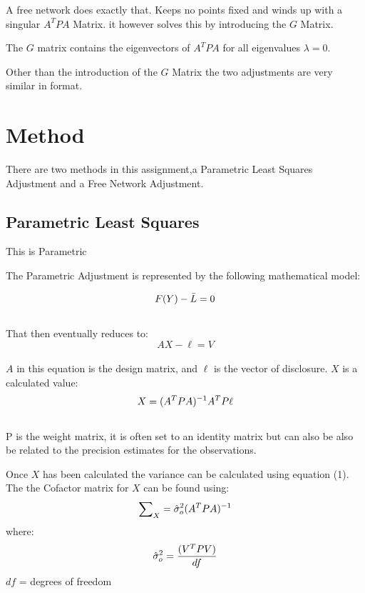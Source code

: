 \documentclass[11pt,a4paper]{article}
\begin{document}
	A free network does exactly that. Keeps no points fixed and winds up with a singular $A^TPA$ Matrix. it however solves this by introducing the $G$ Matrix.
	
	The $G$ matrix contains the eigenvectors of $A^TPA$ for all eigenvalues $\lambda = 0$.
	
	Other than the introduction of the $G$ Matrix the two adjustments are very similar in format.

	
	\section{Method}
	
	There are two methods in this assignment,a Parametric Least Squares Adjustment and a Free Network Adjustment.
	
		\subsection{Parametric Least Squares}
		This is Parametric
		
		The Parametric Adjustment is represented by the following mathematical model:
		
		\begin{equation}
		\notag
		F(Y) - \bar{L} = 0
		\end{equation}
		\\
		That then eventually reduces to:
		\begin{equation}
		AX - \ell = V
		\end{equation}
		\\
		$A$ in this equation is the design matrix, and $\ell$ is the vector of disclosure. $X$ is a calculated value:
		\begin{equation}
		\notag
		X = (A^TPA)^{-1} A^TP\ell
		\end{equation}
		\\
		P is the weight matrix, it is often set to an identity matrix but can also be also be related to the precision estimates for the observations.
		
		Once $X$ has been calculated the variance can be calculated using equation (1).
		The the Cofactor matrix for $X$ can be found using:
		\begin{equation}
		\notag
		\sum\nolimits_{X} = \hat{\sigma}_{o}^2(A^TPA)^{-1}
		\end{equation}
		where:
		\begin{equation}
		\notag
		\hat{\sigma}_{o}^2 = \frac{(V^TPV)}{df} 
		\end{equation}
		  $df$ = degrees of freedom
		
\end{document}
